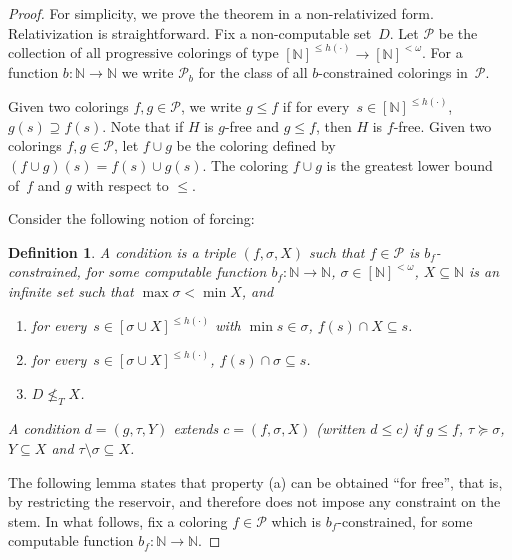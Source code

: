 \documentclass[10pt,a4paper]{article}
\def\P{\mathcal{P}}
\newcommand{\NN}[0]{\mathbb{N}}
\def\qt#1{``#1''}%
\numberwithin{theorem}{section}
\newtheorem{definition}[theorem]{Definition}
\begin{document}
\begin{proof}
For simplicity, we prove the theorem in a non-relativized form. Relativization is straightforward.
Fix a non-computable set~$D$. 
Let $\P$ be the collection of all progressive colorings of type $[\NN]^{\leq h(\cdot)} \to [\NN]^{<\omega}$. For a function $b:\NN\to\NN$ we write $\P_b$ for the class of all $b$-constrained colorings in~$\P$.

Given two colorings $f, g \in \P$, we write $g \leq f$ if for every~$s \in [\NN]^{\leq h(\cdot)}$, $g(s) \supseteq f(s)$.
Note that if $H$ is $g$-free and $g \leq f$, then $H$ is $f$-free.
Given two colorings $f, g \in \P$, let $f \cup g$ be the coloring defined by $(f \cup g)(s) = f(s) \cup g(s)$. The coloring $f \cup g$ is the greatest lower bound of~$f$ and $g$ with respect to $\leq$.


Consider the following notion of forcing:

\begin{definition}
A \emph{condition} is a triple $(f, \sigma, X)$ such that
$f \in \P$ is $b_f$-constrained, for some computable function $b_f : \NN \to \NN$,
$\sigma \in [\NN]^{<\omega}$, $X \subseteq \NN$ is an infinite set such that $\max \sigma < \min X$, and
\begin{enumerate}
    \item[(a)] for every~$s \in [\sigma \cup X]^{\leq h(\cdot)}$ with $\min s \in \sigma$, $f(s) \cap X \subseteq s$.
    \item[(b)] for every~$s \in [\sigma \cup X]^{\leq h(\cdot)}$, $f(s) \cap \sigma \subseteq s$.
    \item[(c)] $D \not \leq_T X$.
\end{enumerate}
A condition $d = (g, \tau, Y)$ \emph{extends} $c = (f, \sigma, X)$ (written $d \leq c$) if
$g \leq f$, $\tau \succeq \sigma$, $Y \subseteq X$ and $\tau \setminus \sigma \subseteq X$.
\end{definition}

The following lemma states that property (a) can be obtained \qt{for free}, that is, by restricting the reservoir, and therefore does not impose any constraint on the stem.
In what follows, fix a coloring $f \in \P$ which is $b_f$-constrained, for some computable function $b_f : \NN \to \NN$.


\end{proof}
\end{document}
